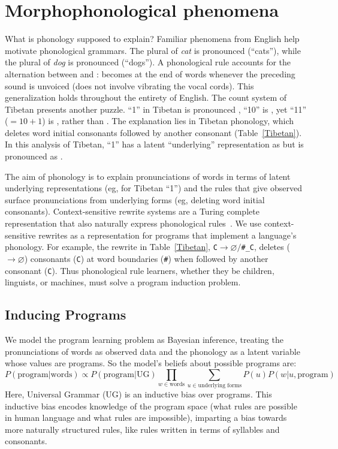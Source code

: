 \documentclass{article}
\begin{document}
\section{Morphophonological phenomena}

What is phonology supposed to explain? Familiar phenomena from
English help motivate phonological grammars.  The plural of \emph{cat}
is pronounced  (``cats''), while the plural of
\emph{dog} is pronounced  (``dogs''). A phonological
rule accounts for the alternation between  and :
 becomes  at the end of words whenever the
preceding sound is unvoiced (does not involve vibrating the vocal
cords). This generalization holds throughout the entirety of English.
The count system of Tibetan presents another puzzle.
``1'' in Tibetan is pronounced
, ``10'' is ,
yet ``11'' ($ = 10 + 1$) is ,
rather than .
The explanation lies in Tibetan phonology,
which deletes word initial consonants followed by another consonant (Table~\ref{Tibetan}).
In this analysis of Tibetan,
``1'' has a latent ``underlying'' representation as 
but is pronounced as .

The aim of phonology is to explain pronunciations of words in terms of
latent underlying representations (eg,  for Tibetan
``1'') and the rules that give observed surface pronunciations from
underlying forms (eg, deleting word initial consonants).
Context-sensitive rewrite systems are a Turing complete representation
that also naturally express phonological
rules~\cite{chomsky1968sound}.  We use context-sensitive rewrites as a
representation for programs that implement a language's phonology.
For example, the rewrite in Table~\ref{Tibetan},
\verb|C|$\to\varnothing /$\verb|#_C|, deletes ($\to\varnothing $)
consonants (\verb|C|) at word boundaries (\verb|#|) when followed by
another consonant (\verb|C|).
Thus phonological rule learners, whether they be children, linguists, or machines, must solve a program induction problem.

\subsection{Inducing Programs}
We model the program learning problem as Bayesian inference, treating the pronunciations of words as observed data and the phonology as a latent variable whose values are programs. So the model's beliefs about possible programs are:
\begin{equation}
  P(\text{program}|\text{words})\propto P(\text{program}|\text{UG})\prod_{w\in\text{words}}\sum_{u\in\text{underlying forms}} P(u)P(w|u,\text{program})
  \end{equation}
Here, Universal Grammar (UG) is an inductive bias over programs. This inductive bias encodes knowledge of the program space (what rules are possible in human language and what rules are impossible), imparting a bias towards more naturally structured rules, like rules written in terms of syllables and consonants.
\end{document}

